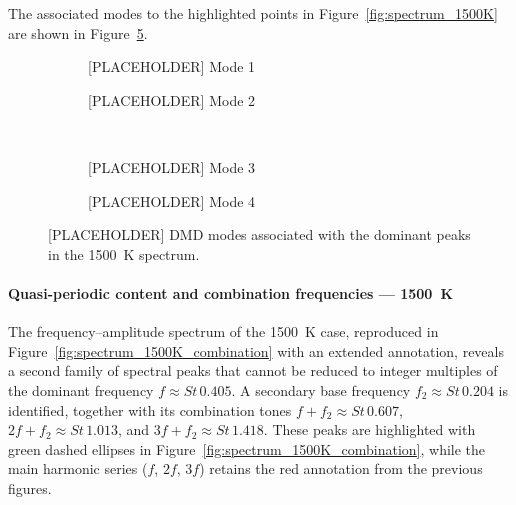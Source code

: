 The associated modes to the highlighted points in Figure~\ref{fig:spectrum_1500K} are shown in Figure~\ref{fig:modes_1500K}.

\FloatBarrier
\begin{figure}[h!]
    \centering
    \begin{subfigure}[b]{0.48\textwidth}
        \centering
        \fbox{\rule{0pt}{4cm}\rule{0.9\linewidth}{0pt}}
        \caption{[PLACEHOLDER] Mode 1}
        \label{fig:modes_1500K_1}
    \end{subfigure}
    \hfill
    \begin{subfigure}[b]{0.48\textwidth}
        \centering
        \fbox{\rule{0pt}{4cm}\rule{0.9\linewidth}{0pt}}
        \caption{[PLACEHOLDER] Mode 2}
        \label{fig:modes_1500K_2}
    \end{subfigure}
    \\[1em]
    \begin{subfigure}[b]{0.48\textwidth}
        \centering
        \fbox{\rule{0pt}{4cm}\rule{0.9\linewidth}{0pt}}
        \caption{[PLACEHOLDER] Mode 3}
        \label{fig:modes_1500K_3}
    \end{subfigure}
    \hfill
    \begin{subfigure}[b]{0.48\textwidth}
        \centering
        \fbox{\rule{0pt}{4cm}\rule{0.9\linewidth}{0pt}}
        \caption{[PLACEHOLDER] Mode 4}
        \label{fig:modes_1500K_4}
    \end{subfigure}
    \caption{[PLACEHOLDER] DMD modes associated with the dominant peaks in the 1500~K spectrum.}
    \label{fig:modes_1500K}
\end{figure}
\FloatBarrier


\paragraph{Quasi-periodic content and combination frequencies — 1500~K}
\label{sec:spectrum_1500K_combination}

The frequency--amplitude spectrum of the 1500~K case, reproduced in Figure~\ref{fig:spectrum_1500K_combination} with an extended annotation, reveals a second family of spectral peaks that cannot be reduced to integer multiples of the dominant frequency $f \approx St\,0.405$. A secondary base frequency $f_2 \approx St\,0.204$ is identified, together with its combination tones $f + f_2 \approx St\,0.607$, $2f + f_2 \approx St\,1.013$, and $3f + f_2 \approx St\,1.418$. These peaks are highlighted with green dashed ellipses in Figure~\ref{fig:spectrum_1500K_combination}, while the main harmonic series ($f$, $2f$, $3f$) retains the red annotation from the previous figures.

